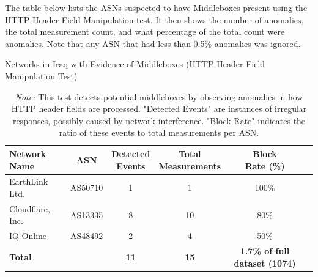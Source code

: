 The table below lists the ASNs suspected to have Middleboxes present using the HTTP Header Field Manipulation test. It then shows the number of anomalies, the total measurement count, and what percentage of the total count were anomalies. Note that any ASN that had less than 0.5\% anomalies was ignored.

\vspace{2em}

\begin{table}[H]
\centering
\caption{Networks in Iraq with Evidence of Middleboxes (HTTP Header Field Manipulation Test)}
\begin{tabular}{lccccc}
\toprule
\textbf{Network Name} & \textbf{ASN} & \shortstack{\textbf{Detected} \\ \textbf{Events}} & \shortstack{\textbf{Total} \\ \textbf{Measurements}} & \shortstack{\textbf{Block} \\ \textbf{Rate (\%)}} \\
\midrule
EarthLink Ltd.        & AS50710  & 1 & 1  & 100\%  \\
Cloudflare, Inc.      & AS13335  & 8 & 10 & 80\%   \\
IQ-Online             & AS48492  & 2 & 4  & 50\%   \\
\bottomrule
\textbf{Total} & & \textbf{11} & \textbf{15} & \textbf{1.7\% of full dataset (1074)} \\
\end{tabular}

\vspace{1em}

\begin{minipage}{0.95\linewidth}
\caption*{\textit{Note:} This test detects potential middleboxes by observing anomalies in how HTTP header fields are processed. "Detected Events" are instances of irregular responses, possibly caused by network interference. "Block Rate" indicates the ratio of these events to total measurements per ASN.}
\end{minipage}
\label{tab:middlebox_http_header}
\end{table}


